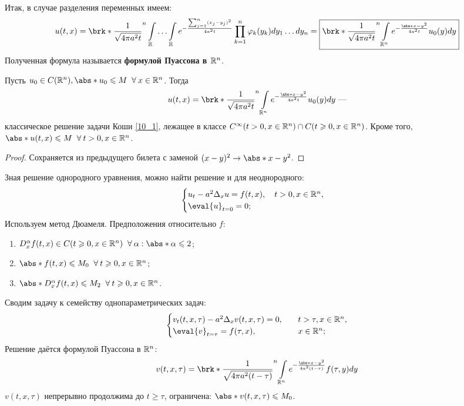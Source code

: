 Итак, в случае разделения переменных имеем:
\begin{equation}
u(t,x) = \brk*{\dfrac{1}{\sqrt{4\pi a^2t}}}^n \int\limits_\R\ldots\int\limits_\R e^{-\frac{\sum_{j=1}^n (x_j - y_j)^2}{4a^2t}} \prod_{k=1}^n \varphi_k(y_k) dy_1\ldots dy_n = \boxed{\brk*{\dfrac{1}{\sqrt{4\pi a^2 t}}}^n \int\limits_{\R^n} e^{-\frac{\abs*{x-y}^2}{4a^2t}} u_0(y)dy}
\end{equation}
Полученная формула называется {\bf формулой Пуассона в $\mathbb{R}^n$}.
\begin{theorem}
	Пусть $u_0 \in C(\R^n), \abs*{u_0} \leqslant M \Forall x \in \R^n$. Тогда 
    \begin{equation*}
    	u(t,x) = \brk*{\dfrac{1}{\sqrt{4\pi a^2 t}}}^n \int\limits_{\R^n} e^{-\frac{\abs*{x-y}^2}{4a^2t}} u_0(y)dy \text{ ---}
    \end{equation*}
    классическое решение задачи Коши \ref{10_1}, лежащее в классе $C^\infty(t>0, x \in \mathbb{R}^n) \cap C(t \geqslant 0, x \in \mathbb{R}^n)$. Кроме того,~$\abs*{u(t,x)} \leqslant M \Forall t > 0, x \in \R^n$.
\end{theorem}
\begin{proof}
	Сохраняется из предыдущего билета с заменой $(x-y)^2 \to \abs*{x-y}^2$.
\end{proof}
\bigskip
Зная решение однородного уравнения, можно найти решение и для неоднородного:
\begin{equation}
	\begin{cases}
    	u_t - a^2\Delta_xu = f(t,x), \quad t > 0, x \in \R^n, \\
        \eval{u}_{t=0} = 0;
    \end{cases}
\end{equation}
Используем метод Дюамеля. Предположения относительно $f$:
\begin{enumerate}
	\item $D_x^\alpha f(t,x) \in C(t \geqslant 0, x \in \R^n) \Forall \alpha: \abs*{\alpha} \leqslant 2$;
    \item $\abs*{f(t,x)} \leqslant M_0 \Forall t \geqslant 0, x \in \R^n$;
    \item $\abs*{D_x^\alpha f(t,x)} \leqslant M_2 \Forall t \geqslant 0, x \in \R^n$.
\end{enumerate}
Сводим задачу к семейству однопараметрических задач:
\begin{equation}
	\begin{cases}
    	v_t(t,x,\tau) - a^2\Delta_xv(t,x,\tau) = 0, \quad & t > \tau, x \in \R^n, \\
        \eval{v}_{t = \tau} = f(\tau, x), \quad & x \in \R^n;
    \end{cases}
\end{equation}
Решение даётся формулой Пуассона в $\mathbb{R}^n$:
\begin{equation*}
	v(t,x,\tau) = \brk*{\dfrac{1}{\sqrt{4\pi a^2 (t - \tau)}}}^n \int\limits_{\R^n} e^{-\frac{\abs*{x-y}^2}{4a^2(t-\tau)}} f(\tau, y) dy
\end{equation*}
$v(t,x,\tau)$ непрерывно продолжима до $t \geqslant \tau$, ограничена: $\abs*{v(t,x,\tau)} \leqslant M_0$.

